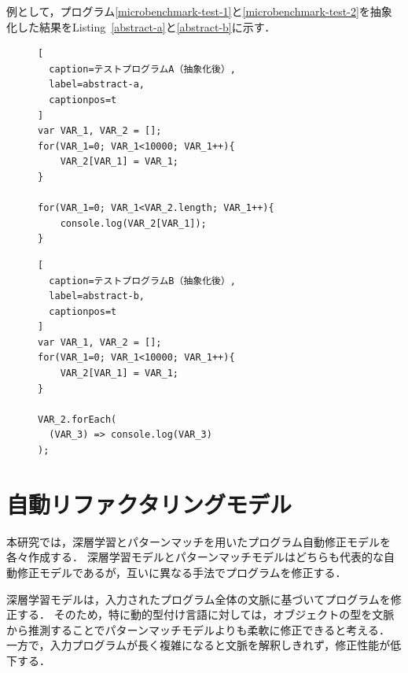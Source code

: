 \documentclass[11pt]{jreport}
\begin{document}
例として，プログラム\ref{microbenchmark-test-1}と\ref{microbenchmark-test-2}を抽象化した結果をListing~\ref{abstract-a}と\ref{abstract-b}に示す．


\begin{figure}[t]
\captionsetup{name=Listing}
\hspace{0.04\columnwidth}
\begin{minipage}[b]{0.96\linewidth}
\begin{lstlisting}[
  caption=テストプログラムA（抽象化後）,
  label=abstract-a,
  captionpos=t
]
var VAR_1, VAR_2 = [];
for(VAR_1=0; VAR_1<10000; VAR_1++){
    VAR_2[VAR_1] = VAR_1;
}

for(VAR_1=0; VAR_1<VAR_2.length; VAR_1++){
    console.log(VAR_2[VAR_1]);
}
\end{lstlisting}
\end{minipage}
\end{figure}

\begin{figure}[t]
\captionsetup{name=Listing}
\hspace{0.04\columnwidth}
\begin{minipage}[b]{0.96\linewidth}
\begin{lstlisting}[
  caption=テストプログラムB（抽象化後）,
  label=abstract-b,
  captionpos=t
]
var VAR_1, VAR_2 = [];
for(VAR_1=0; VAR_1<10000; VAR_1++){
    VAR_2[VAR_1] = VAR_1;
}

VAR_2.forEach(
  (VAR_3) => console.log(VAR_3)
);
\end{lstlisting}
\end{minipage}
\end{figure}




\chapter{自動リファクタリングモデル}\label{chapter:model}


本研究では，深層学習とパターンマッチを用いたプログラム自動修正モデルを各々作成する．
深層学習モデルとパターンマッチモデルはどちらも代表的な自動修正モデルであるが，互いに異なる手法でプログラムを修正する．

深層学習モデルは，入力されたプログラム全体の文脈に基づいてプログラムを修正する．
そのため，特に動的型付け言語に対しては，オブジェクトの型を文脈から推測することでパターンマッチモデルよりも柔軟に修正できると考える．
一方で，入力プログラムが長く複雑になると文脈を解釈しきれず，修正性能が低下する．
\end{document}
